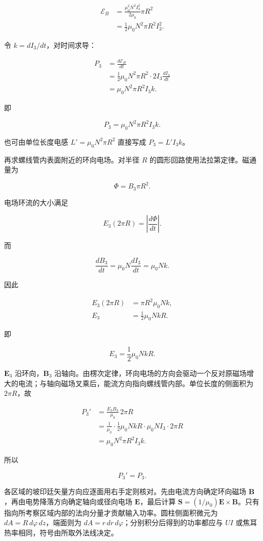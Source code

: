 \documentclass[12pt,a4paper,UTF8]{ctexart}
\begin{document}
\[\begin{aligned}
\mathcal E_B
&=\frac{\mu_0^2N^2I_3^2}{2\mu_0}\pi R^2\\
&=\frac12\mu_0N^2\pi R^2I_3^2.
\end{aligned}\]

令 \(k=dI_3/dt\)，对时间求导：

\[\begin{aligned}
P_3
&=\frac{d\mathcal E_B}{dt}\\
&=\frac12\mu_0N^2\pi R^2\cdot2I_3\frac{dI_3}{dt}\\
&=\mu_0N^2\pi R^2I_3k.
\end{aligned}\]

即

\[\boxed{P_3=\mu_0N^2\pi R^2I_3k}.\]

也可由单位长度电感 \(L'=\mu_0N^2\pi R^2\) 直接写成 \(P_3=L'I_3k\)。

再求螺线管内表面附近的环向电场。对半径 \(R\)
的圆形回路使用法拉第定律。磁通量为

\[\Phi=B_3\pi R^2.\]

电场环流的大小满足

\[E_3(2\pi R)=\left|\frac{d\Phi}{dt}\right|.\]

而

\[\frac{dB_3}{dt}=\mu_0N\frac{dI_3}{dt}=\mu_0Nk.\]

因此

\[\begin{aligned}
E_3(2\pi R)
&=\pi R^2\mu_0Nk,\\
E_3
&=\frac12\mu_0NkR.
\end{aligned}\]

即

\[\boxed{E_3=\frac12\mu_0NkR}.\]

\(\bm E_3\) 沿环向，\(\bm B_3\)
沿轴向。由楞次定律，环向电场的方向会驱动一个反对原磁场增大的电流；与轴向磁场叉乘后，能流方向指向螺线管内部。单位长度的侧面积为
\(2\pi R\)，故

\[\begin{aligned}
P_3'
&=\frac{E_3B_3}{\mu_0}\,2\pi R\\
&=\frac1{\mu_0}
\cdot\frac12\mu_0NkR
\cdot\mu_0NI_3
\cdot2\pi R\\
&=\mu_0N^2\pi R^2I_3k.
\end{aligned}\]

所以

\[\boxed{P_3'=P_3}.\]

各区域的坡印廷矢量方向应逐面用右手定则核对。先由电流方向确定环向磁场
\(\bm B\)，再由电势降落方向确定轴向或径向电场 \(\bm E\)，最后计算
\(\bm S=(1/\mu_0)\bm E\times\bm B\)。只有指向所考察区域内部的法向分量才贡献输入功率。圆柱侧面积微元为
\(dA=R\,d\varphi\,dz\)，端面则为
\(dA=r\,dr\,d\varphi\)；分别积分后得到的功率都应与 \(UI\)
或焦耳热率相同，符号由所取外法线决定。
\end{document}
